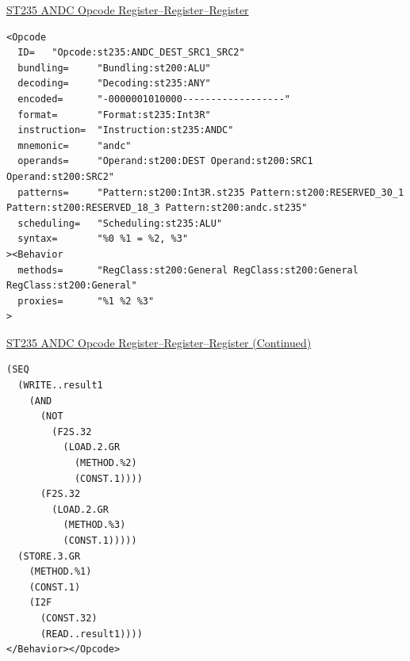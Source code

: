 \documentclass[a4]{seminar}
\begin{document}
\begin{slide}

\begin{center} \underline{ST235 ANDC Opcode Register--Register--Register} \end{center}

{\scriptsize
\begin{verbatim}
<Opcode
  ID=   "Opcode:st235:ANDC_DEST_SRC1_SRC2"
  bundling=     "Bundling:st200:ALU"
  decoding=     "Decoding:st235:ANY"
  encoded=      "-0000001010000------------------"
  format=       "Format:st235:Int3R"
  instruction=  "Instruction:st235:ANDC"
  mnemonic=     "andc"
  operands=     "Operand:st200:DEST Operand:st200:SRC1 Operand:st200:SRC2"
  patterns=     "Pattern:st200:Int3R.st235 Pattern:st200:RESERVED_30_1 Pattern:st200:RESERVED_18_3 Pattern:st200:andc.st235"
  scheduling=   "Scheduling:st235:ALU"
  syntax=       "%0 %1 = %2, %3"
><Behavior
  methods=      "RegClass:st200:General RegClass:st200:General RegClass:st200:General"
  proxies=      "%1 %2 %3"
>
\end{verbatim}
}

\end{slide}


\begin{slide}

\begin{center} \underline{ST235 ANDC Opcode Register--Register--Register (Continued)} \end{center}

{\scriptsize
\begin{verbatim}
(SEQ
  (WRITE..result1
    (AND
      (NOT
        (F2S.32
          (LOAD.2.GR
            (METHOD.%2)
            (CONST.1))))
      (F2S.32
        (LOAD.2.GR
          (METHOD.%3)
          (CONST.1)))))
  (STORE.3.GR
    (METHOD.%1)
    (CONST.1)
    (I2F
      (CONST.32)
      (READ..result1))))
</Behavior></Opcode>
\end{verbatim}
}

\end{slide}
\end{document}
